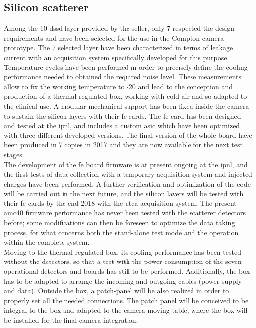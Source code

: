 \subsection{Silicon scatterer}\label{chap3::subsec::scattNext}
Among the 10 \gls{dssd} layer provided by the seller, only 7 respected the design requirements and have been selected for the use in the Compton camera prototype. The 7 selected layer have been characterized in terms of leakage current with an acquisition system specifically developed for this purpose. Temperature cycles have been performed in order to precisely define the cooling performance needed to obtained the required noise level. These measurements allow to fix the working temperature to -20\textdegree{} and lead to the conception and production of a thermal regulated box, working with cold air and so adapted to the clinical use. A modular mechanical support has been fixed inside the camera to sustain the silicon layers with their \gls{fe} cards. The \gls{fe} card has been designed and tested at the \gls{ipnl}, and includes a custom \gls{asic} which have been optimized with three different developed versions. The final version of the whole board have been produced in 7 copies in 2017 and they are now available for the next test stages.\\
The development of the \gls{fe} board firmware is at present ongoing at the \gls{ipnl}, and the first tests of data collection with a temporary acquisition system and injected charges have been performed. A further verification and optimization of the code will be carried out in the next future, and the silicon layers will be tested with their \gls{fe} cards by the end 2018 with the \gls{utca} acquisition system. The present \gls{amc}40 firmware performance has never been tested with the scatterer detectors before; some modifications can then be foreseen to optimize the data taking process, for what concerns both the stand-alone test mode and the operation within the complete system.\\ Moving to the thermal regulated box, its cooling performance has been tested without the detectors, so that a test with the power consumption of the seven operational detectors and boards has still to be performed. Additionally, the box has to be adapted to arrange the incoming and outgoing cables (power supply and data). Outside the box, a patch-panel will be also realized in order to properly set all the needed connections. The patch panel will be conceived to be integral to the box and adapted to the camera moving table, where the box will be installed for the final camera integration.\\
